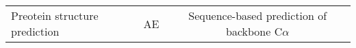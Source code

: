 \begin{center}
\begin{tabular}{l c c}
    Preotein structure prediction & AE & Sequence-based prediction of backbone C$\alpha$  
\end{tabular}
\end{center}